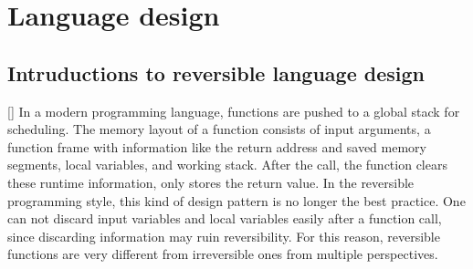 \documentclass[aps,twocolumn,longbibliography,english,superscriptaddress]{revtex4-1}
\newcommand{\<}{\langle}
\renewcommand{\>}{\rangle}
\newcommand{\violet}[1]{[{\bf  \color{violet}{MLS: #1}}]}
\theoremstyle{definition}\newtheorem{definition}{\textit{Definition}}
\begin{document}
\section{Language design}\label{sec:lang}

\subsection{Intruductions to reversible language design}
    \violet{Add more introduction to reversible programming}
    In a modern programming language, functions are pushed to a global stack for scheduling. The memory layout of a function consists of input arguments, a function frame with information like the return address and saved memory segments, local variables, and working stack. After the call, the function clears these runtime information, only stores the return value. In the reversible programming style, this kind of design pattern is no longer the best practice. One can not discard input variables and local variables easily after a function call, since discarding information may ruin reversibility. For this reason, reversible functions are very different from irreversible ones from multiple perspectives.
\end{document}
